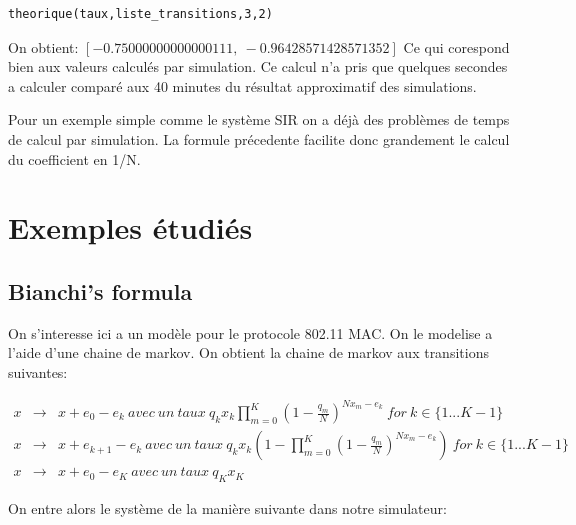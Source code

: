 \documentclass[a4paper]{article}
\begin{document}
\begin{lstlisting}[frame=single]
  theorique(taux,liste_transitions,3,2)
\end{lstlisting}

On obtient: $[-0.75000000000000111,\ -0.96428571428571352]$
Ce qui corespond bien aux valeurs calculés par simulation. Ce calcul
n'a pris que quelques secondes a calculer comparé aux 40 minutes du
résultat approximatif des simulations.

Pour un exemple simple comme le système SIR on a déjà des problèmes de
temps de calcul par simulation. La formule précedente facilite donc
grandement le calcul du coefficient en 1/N.


\section{Exemples étudiés}

\subsection{Bianchi's formula}
On s'interesse ici a un modèle \cite{bianchi} pour le protocole 802.11 MAC. On le
modelise a l'aide d'une chaine de markov. On obtient la chaine de
markov aux transitions suivantes:

\begin{eqnarray*}
  x & \rightarrow & x+e_0-e_k \ avec\ un\ taux \
  q_kx_k\prod_{m=0}^K(1-\frac{q_m}{N})^{Nx_m-e_k} \ for \ k \in
                    \{1...K-1\} \\
  x & \rightarrow & x+e_{k+1}-e_k \ avec\ un\ taux \
  q_kx_k(1-\prod_{m=0}^K(1-\frac{q_m}{N})^{Nx_m-e_k}) \ for \ k \in
                    \{1...K-1\} \\
  x & \rightarrow & x+e_0-e_K \ avec \ un \ taux \ q_Kx_K
\end{eqnarray*}

On entre alors le système de la manière suivante dans notre
simulateur:
\end{document}
